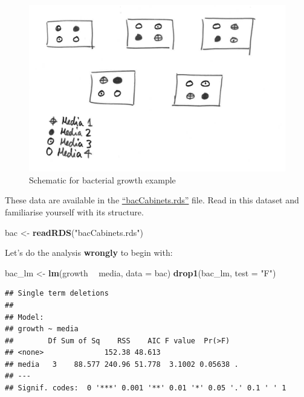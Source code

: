 \documentclass[]{book}
\newenvironment{Shaded}{\begin{snugshade}}{\end{snugshade}}
\newcommand{\KeywordTok}[1]{\textcolor[rgb]{0.13,0.29,0.53}{\textbf{#1}}}
\newcommand{\DataTypeTok}[1]{\textcolor[rgb]{0.13,0.29,0.53}{#1}}
\newcommand{\StringTok}[1]{\textcolor[rgb]{0.31,0.60,0.02}{#1}}
\newcommand{\OperatorTok}[1]{\textcolor[rgb]{0.81,0.36,0.00}{\textbf{#1}}}
\newcommand{\NormalTok}[1]{#1}
\theoremstyle{definition}
\theoremstyle{definition}
\theoremstyle{definition}
\theoremstyle{remark}
\begin{document}
\begin{figure}

{\centering \includegraphics[width=0.8\linewidth,height=0.8\textheight]{_img/bacCabinets} 

}

\caption{Schematic for bacterial growth example}\label{fig:bacCabinets}
\end{figure}

These data are available in the
\href{https://exeter-data-analytics.github.io/StatModelling/_data/bacCabinets.rds}{``bacCabinets.rds''}
file. Read in this dataset and familiarise yourself with its structure.

\begin{Shaded}
\begin{Highlighting}[]
\NormalTok{bac <-}\StringTok{ }\KeywordTok{readRDS}\NormalTok{(}\StringTok{"bacCabinets.rds"}\NormalTok{)}
\end{Highlighting}
\end{Shaded}

Let's do the analysis \textbf{wrongly} to begin with:

\begin{Shaded}
\begin{Highlighting}[]
\NormalTok{bac_lm <-}\StringTok{ }\KeywordTok{lm}\NormalTok{(growth }\OperatorTok{~}\StringTok{ }\NormalTok{media, }\DataTypeTok{data =}\NormalTok{ bac)}
\KeywordTok{drop1}\NormalTok{(bac_lm, }\DataTypeTok{test =} \StringTok{"F"}\NormalTok{)}
\end{Highlighting}
\end{Shaded}

\begin{verbatim}
## Single term deletions
## 
## Model:
## growth ~ media
##        Df Sum of Sq    RSS    AIC F value  Pr(>F)  
## <none>              152.38 48.613                  
## media   3    88.577 240.96 51.778  3.1002 0.05638 .
## ---
## Signif. codes:  0 '***' 0.001 '**' 0.01 '*' 0.05 '.' 0.1 ' ' 1
\end{verbatim}
\end{document}
